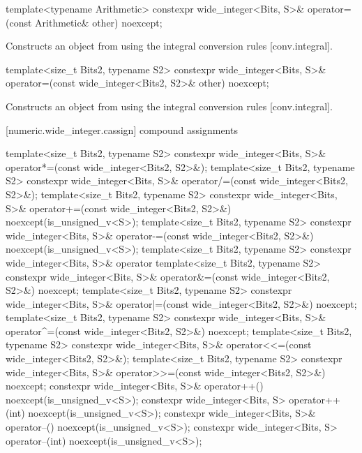 \begin{itemdecl}
template<typename Arithmetic>
  constexpr wide_integer<Bits, S>& operator=(const Arithmetic& other) noexcept;
\end{itemdecl}

\begin{itemdescr}
\effects Constructs an object from  using the integral conversion rules [conv.integral].
\end{itemdescr}

\begin{itemdecl}
template<size_t Bits2, typename S2>
  constexpr wide_integer<Bits, S>& operator=(const wide_integer<Bits2, S2>& other) noexcept;    
\end{itemdecl}

\begin{itemdescr}
\effects Constructs an object from  using the integral conversion rules [conv.integral].
\end{itemdescr}

[numeric.wide_integer.cassign]{ compound assignments}

\begin{itemdecl}
template<size_t Bits2, typename S2> 
  constexpr wide_integer<Bits, S>& operator*=(const wide_integer<Bits2, S2>&);
template<size_t Bits2, typename S2> 
  constexpr wide_integer<Bits, S>& operator/=(const wide_integer<Bits2, S2>&);
template<size_t Bits2, typename S2> 
  constexpr wide_integer<Bits, S>& operator+=(const wide_integer<Bits2, S2>&) noexcept(is_unsigned_v<S>);
template<size_t Bits2, typename S2> 
  constexpr wide_integer<Bits, S>& operator-=(const wide_integer<Bits2, S2>&) noexcept(is_unsigned_v<S>);
template<size_t Bits2, typename S2> 
  constexpr wide_integer<Bits, S>& operator%
template<size_t Bits2, typename S2> 
  constexpr wide_integer<Bits, S>& operator&=(const wide_integer<Bits2, S2>&) noexcept;
template<size_t Bits2, typename S2> 
  constexpr wide_integer<Bits, S>& operator|=(const wide_integer<Bits2, S2>&) noexcept;
template<size_t Bits2, typename S2> 
  constexpr wide_integer<Bits, S>& operator^=(const wide_integer<Bits2, S2>&) noexcept;
template<size_t Bits2, typename S2> 
  constexpr wide_integer<Bits, S>& operator<<=(const wide_integer<Bits2, S2>&);
template<size_t Bits2, typename S2> 
  constexpr wide_integer<Bits, S>& operator>>=(const wide_integer<Bits2, S2>&) noexcept;
constexpr wide_integer<Bits, S>& operator++() noexcept(is_unsigned_v<S>);
constexpr wide_integer<Bits, S> operator++(int) noexcept(is_unsigned_v<S>);
constexpr wide_integer<Bits, S>& operator--() noexcept(is_unsigned_v<S>);
constexpr wide_integer<Bits, S> operator--(int) noexcept(is_unsigned_v<S>);
\end{itemdecl}


